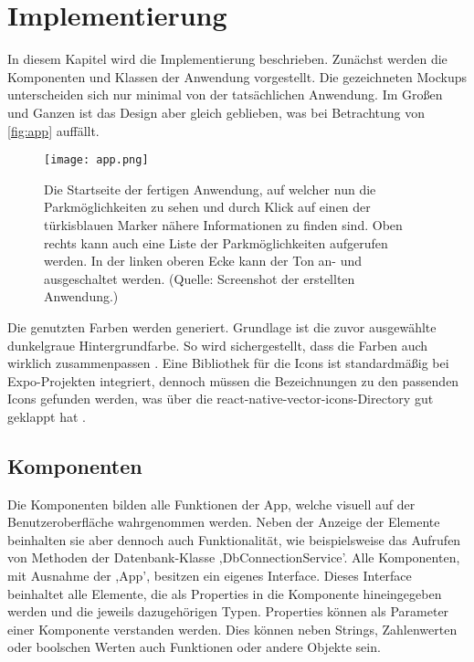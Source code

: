 \chapter{Implementierung}
\label{implementierung}
\renewcommand{\arraystretch}{1.2}

In diesem Kapitel wird die Implementierung beschrieben. Zunächst werden die Komponenten und Klassen der Anwendung vorgestellt. Die gezeichneten Mockups unterscheiden sich nur minimal von der tatsächlichen Anwendung. Im Großen und Ganzen ist das Design aber gleich geblieben, was bei Betrachtung von \autoref{fig:app} auffällt.

\begin{figure}[h!]
	\centering
	\texttt{[image: app.png]}
	\caption[Die Startseite der fertigen Anwendung, auf welcher nun die Parkmöglichkeiten zu sehen und durch Klick auf einen der türkisblauen Marker nähere Informationen zu finden sind. Oben rechts kann auch eine Liste der Parkmöglichkeiten aufgerufen werden. In der linken oberen Ecke kann der Ton an- und ausgeschaltet werden.]
	{Die Startseite der fertigen Anwendung, auf welcher nun die Parkmöglichkeiten zu sehen und durch Klick auf einen der türkisblauen Marker nähere Informationen zu finden sind. Oben rechts kann auch eine Liste der Parkmöglichkeiten aufgerufen werden. In der linken oberen Ecke kann der Ton an- und ausgeschaltet werden. (Quelle: Screenshot der erstellten Anwendung.)}
	\label{fig:app}
\end{figure}
\newpage

Die genutzten Farben werden generiert. Grundlage ist die zuvor ausgewählte dunkelgraue Hintergrundfarbe. So wird sichergestellt, dass die Farben auch wirklich zusammenpassen \cite{colors}. Eine Bibliothek für die Icons ist standardmäßig bei Expo-Projekten integriert, dennoch müssen die Bezeichnungen zu den passenden Icons gefunden werden, was über die react-native-vector-icons-Directory gut geklappt hat \cite{icons}.
\section{Komponenten}
Die Komponenten bilden alle Funktionen der App, welche visuell auf der Benutzeroberfläche wahrgenommen werden. Neben der Anzeige der Elemente beinhalten sie aber dennoch auch Funktionalität, wie beispielsweise das Aufrufen von Methoden der Datenbank-Klasse ,DbConnectionService'. Alle Komponenten, mit Ausnahme der ,App', besitzen ein eigenes Interface. Dieses Interface beinhaltet alle Elemente, die als Properties in die Komponente hineingegeben werden und die jeweils dazugehörigen Typen. Properties können als Parameter einer Komponente verstanden werden. Dies können neben Strings, Zahlenwerten oder boolschen Werten auch Funktionen oder andere Objekte sein.
